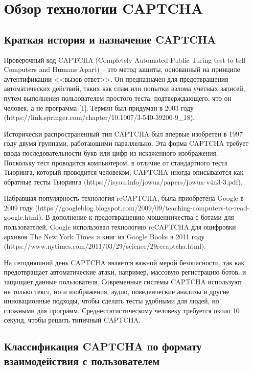 \chapter{Обзор технологии CAPTCHA}

\section{Краткая история и назначение CAPTCHA}

Проверочный код CAPTCHA (Completely Automated Public Turing test to tell Computers 
and Humans Apart) -- это метод защиты, основанный на принципе аутентификации 
<<вызов-ответ>>. Он предназначен для предотвращения автоматических действий, таких 
как спам или попытки взлома учетных записей, путем выполнения пользователем 
простого теста, подтверждающего, что он человек, а не программа [1]. Термин был 
придуман в 2003 году (https://link.springer.com/chapter/10.1007/3-540-39200-9\_18).

Исторически распространенный тип CAPTCHA был впервые изобретен в 1997 году двумя 
группами, работающими параллельно. Эта форма CAPTCHA требует ввода 
последовательности букв или цифр из искаженного изображения. Поскольку тест 
проводится компьютером, в отличие от стандартного теста Тьюринга, который 
проводится человеком, CAPTCHA иногда описываются как обратные тесты Тьюринга 
(https://isyou.info/jowua/papers/jowua-v4n3-3.pdf).

Набравшая популярность технология reCAPTCHA, была приобретена Google в 2009 году 
(https://googleblog.blogspot.com/2009/09/teaching-computers-to-read-google.html). 
В дополнение к предотвращению мошенничества с ботами для пользователей, Google 
использовал технологию reCAPTCHA для оцифровки архивов The New York Times и книг 
из Google Books в 2011 году (https://www.nytimes.com/2011/03/29/science/29recaptcha.html).

На сегодняшний день CAPTCHA является важной мерой безопасности, так как 
предотвращает автоматические атаки, например, массовую регистрацию ботов, и 
защищает данные пользователя. Современные системы CAPTCHA используют не только 
текст, но и изображения, аудио, поведенческие анализы и другие инновационные 
подходы, чтобы сделать тесты удобными для людей, но сложными для программ. 
Среднестатистическому человеку требуется около 10 секунд, чтобы решить типичный 
CAPTCHA.

\section{Классификация CAPTCHA по формату взаимодействия с пользователем}

